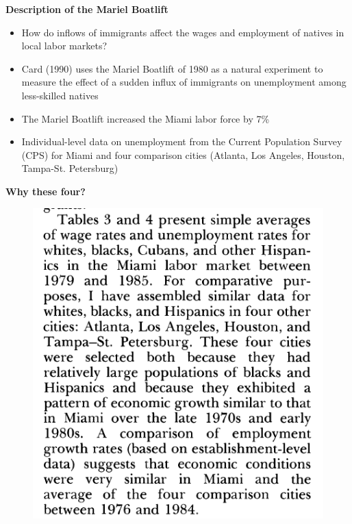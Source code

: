 \documentclass[notes=show]{beamer}
\begin{document}
\begin{frame}[plain]
	\begin{center}
	\textbf{Description of the Mariel Boatlift}
	\end{center}
	
	\begin{itemize}
	\item How do inflows of immigrants affect the wages and employment of natives in local labor markets?
	\item Card (1990) uses the Mariel Boatlift of 1980 as a natural experiment to measure the effect of a sudden influx of immigrants on unemployment among less-skilled natives
	\item The Mariel Boatlift increased the Miami labor force by 7\%
	\item Individual-level data on unemployment from the Current Population Survey (CPS) for Miami and four comparison cities (Atlanta, Los Angeles, Houston, Tampa-St. Petersburg)
	\end{itemize}
\end{frame}


\begin{frame}[plain]
\begin{center}
\textbf{Why these four?}
\end{center}

	\begin{figure}
	\includegraphics[scale=0.25]{./lecture_includes/card_illr.png}
	\end{figure}

\end{frame}
\end{document}
